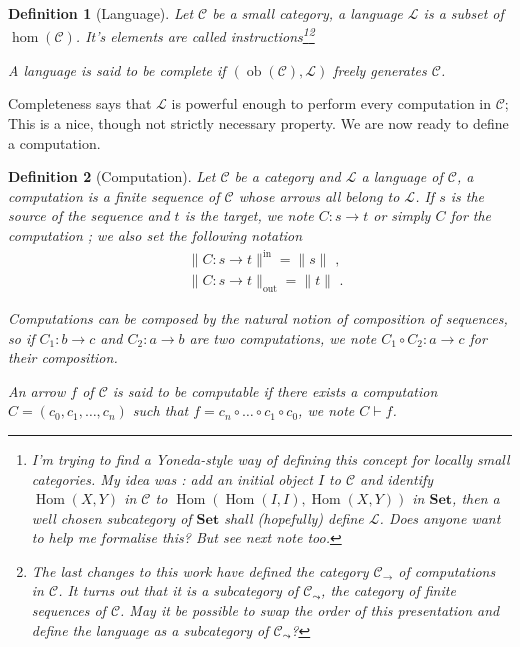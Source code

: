 \documentclass{article}
\newcommand{\cat}[1]{\mathscr{#1}}
\newcommand{\lcat}[1]{\mathbf{#1}}
\newcommand{\C}{\cat{C}}
\renewcommand{\L}{\cat{L}}
\newcommand{\comp}{\circ}
\newcommand{\size}[1]{\lVert#1\rVert}
\newcommand{\sizein}[1]{\size{#1}^\mathrm{in}}
\newcommand{\sizeout}[1]{\size{#1}_\mathrm{out}}
\DeclareMathOperator{\ob}{ob}
\DeclareMathOperator{\Hom}{Hom}
\newcommand{\ra}{\rightarrow}
\newcommand{\computes}{\vdash}
\newtheorem{definition}{Definition}
\begin{document}
  \begin{definition}[Language]
    Let $\C$ be a small category, a language $\L$ is a subset of
    $\hom(\C)$. It's elements are called
    \emph{instructions}\footnote{I'm trying to find a Yoneda-style way
    of defining this concept for locally small categories. My idea was
    : add an initial object $I$ to $\C$ and identify $\Hom(X,Y)$ in
    $\C$ to $\Hom\left(\Hom(I,I), \Hom(X,Y)\right)$ in $\lcat{Set}$,
    then a well chosen subcategory of $\lcat{Set}$ shall (hopefully)
    define $\L$. Does anyone want to help me formalise this? But see
    next note too.}\footnote{The last changes to this work have
    defined the category $\C_\ra$ of computations in $\C$. It turns
    out that it is a subcategory of $\C_\leadsto$, the category of
    finite sequences of $\C$. May it be possible to swap the order of
    this presentation and define the language as a subcategory of
    $\C_\leadsto$?}
    
    A language is said to be \emph{complete} if $(\ob(\C),\L)$ freely
    generates $\C$.
  \end{definition}

  Completeness says that $\L$ is powerful enough to perform every
  computation in $\C$; This is a nice, though not strictly necessary
  property. We are now ready to define a computation.

  \begin{definition}[Computation]
    Let $\C$ be a category and $\L$ a language of $\C$, a
    \emph{computation} is a finite sequence of $\C$ whose arrows all
    belong to $\L$. If $s$ is the source of the sequence and $t$ is
    the target, we note $C:s\ra t$ or simply $C$ for the
    computation ; we also set the following notation
    \begin{align*}
      &\sizein{C:s\ra t} = \size{s} \text{ ,}\\
      &\sizeout{C:s\ra t} = \size{t} \text{ .}
    \end{align*}
    
    Computations can be composed by the natural notion of composition
    of sequences, so if $C_1 : b\ra c$ and $C_2 : a\ra b$ are two
    computations, we note $C_1\comp C_2 : a\ra c$ for their
    composition.

    An arrow $f$ of $\C$ is said to be \emph{computable} if there
    exists a computation $C = (c_0, c_1,\ldots,c_n)$ such that $f =
    c_n\comp\ldots\comp c_1\comp c_0$, we note $C\computes f$.
  \end{definition}
\end{document}

